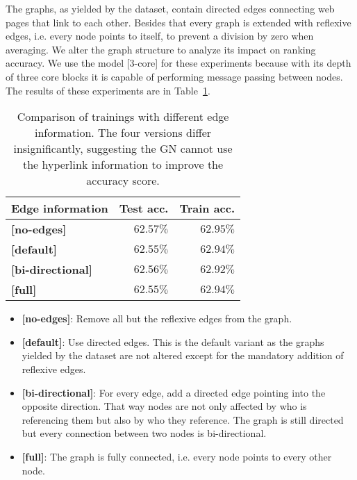 The graphs, as yielded by the dataset, contain directed edges connecting web pages that link to each other. Besides that every graph is extended with reflexive edges, i.e. every node points to itself, to prevent a division by zero when averaging. We alter the graph structure to analyze its impact on ranking accuracy. We use the model [3-core] for these experiments because with its depth of three core blocks it is capable of performing message passing between nodes. The results of these experiments are in Table~\ref{tab:edgecomparison}.

\begin{table}
    \centering
    \begin{tabular}{lrr}
        \textbf{Edge information} & \textbf{Test acc.} & \textbf{Train acc.}\\\hline
        \textbf{[no-edges]} & $\bm{62.57\%}$ & $\bm{62.95\%}$\\
        \textbf{[default]} & $62.55\%$ & $62.94\%$\\
        \textbf{[bi-directional]} & $62.56\%$ & $62.92\%$\\
        \textbf{[full]} & $62.55\%$ & $62.94\%$\\
    \end{tabular}
    \caption[Comparison of trainings with different edge information]{Comparison of trainings with different edge information. The four versions differ insignificantly, suggesting the GN cannot use the hyperlink information to improve the accuracy score.}
    \label{tab:edgecomparison}
\end{table}

\begin{itemize}
    \item \textbf{[no-edges]}: Remove all but the reflexive edges from the graph.
    \item \textbf{[default]}: Use directed edges. This is the default variant as the graphs yielded by the dataset are not altered except for the mandatory addition of reflexive edges.
    \item \textbf{[bi-directional]}: For every edge, add a directed edge pointing into the opposite direction. That way nodes are not only affected by who is referencing them but also by who they reference. The graph is still directed but every connection between two nodes is bi-directional.
    \item \textbf{[full]}: The graph is fully connected, i.e. every node points to every other node.
\end{itemize}

